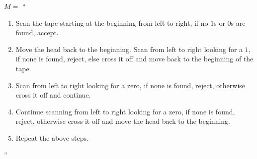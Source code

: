 




\homeworkheader{\classnameandsection}

\begin{problem}{1}
  \begin{solution}
    $M =$ ``
    \begin{enumerate}
      \item Scan the tape starting at the beginning from left to right, if no $1$s or $0$s are found, accept.\\
      \item Move the head back to the beginning. Scan from left to right looking for a $1$, if none is found, reject, else cross it off and move back to the beginning of the tape.\\
      \item Scan from left to right looking for a zero, if none is found, reject, otherwise cross it off and continue.\\
      \item Continue scanning from left to right looking for a zero, if none is found, reject, otherwise cross it off and
      move the head back to the beginning.\\
      \item Repeat the above steps.
    \end{enumerate}
    ''
  \end{solution}
\end{problem}

